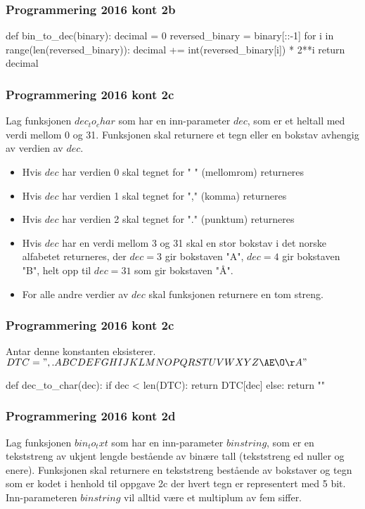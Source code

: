 \begin{frame}[fragile]
    \frametitle{Programmering 2016 kont 2b}

\begin{python}
def bin_to_dec(binary): 
    decimal = 0
    reversed_binary = binary[::-1]
    for i in range(len(reversed_binary)):
        decimal += int(reversed_binary[i]) * 2**i 
    return decimal
\end{python}

\end{frame}

\begin{frame}
    \frametitle{Programmering 2016 kont 2c}

    Lag funksjonen $dec_to_char$ som har en inn-parameter $dec$, som er et heltall med verdi mellom 0 og 31. Funksjonen skal returnere et tegn eller en bokstav avhengig av verdien av $dec$. 

    \begin{itemize}
        \item Hvis $dec$ har verdien 0 skal tegnet for " " (mellomrom) returneres
        \item Hvis $dec$ har verdien 1 skal tegnet for "," (komma) returneres
        \item Hvis $dec$ har verdien 2 skal tegnet for "." (punktum) returneres
        \item Hvis $dec$ har en verdi mellom 3 og 31 skal en stor bokstav i det norske alfabetet returneres, der $dec=3$ gir bokstaven "A", $dec=4$ gir bokstaven "B", helt opp til $dec=31$ som gir bokstaven "Å". 
        \item For alle andre verdier av $dec$ skal funksjonen returnere en tom streng. 
    \end{itemize}

\end{frame}

\begin{frame}[fragile]
    \frametitle{Programmering 2016 kont 2c}

    Antar denne konstanten eksisterer. 
    $DTC = " ,.ABCDEFGHIJKLMNOPQRSTUVWXYZÆØÅ"$

\begin{python}
def dec_to_char(dec):
    if dec < len(DTC): 
        return DTC[dec]
    else: 
        return ""
\end{python}

\end{frame}

\begin{frame}
    \frametitle{Programmering 2016 kont 2d}

    Lag funksjonen $bin_to_txt$ som har en inn-parameter $binstring$, som er en tekststreng av ukjent lengde bestående av binære tall (tekststreng ed nuller og enere). Funksjonen skal returnere en tekststreng bestående av bokstaver og tegn som er kodet i henhold til oppgave 2c der hvert tegn er representert med 5 bit. Inn-parameteren $binstring$ vil alltid være et multiplum av fem siffer. 

\end{frame}

